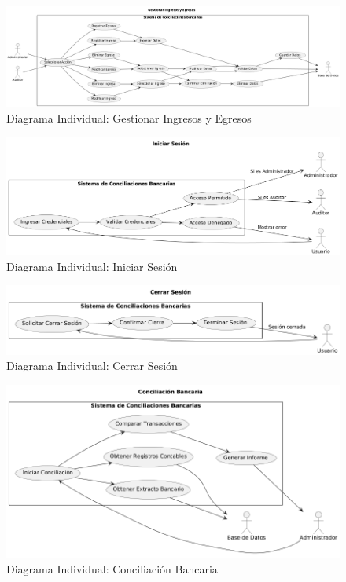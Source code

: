 \documentclass{article}
\begin{document}
\begin{figure}[H]
    \centering
    \includegraphics[width=\textwidth]{casos/GestionarIngresosEgresos.png}
    \caption{Diagrama Individual: Gestionar Ingresos y Egresos}
\end{figure}

\begin{figure}[H]
    \centering
    \includegraphics[width=\textwidth]{casos/IniciarSesion.png}
    \caption{Diagrama Individual: Iniciar Sesión}
\end{figure}

\begin{figure}[H]
    \centering
    \includegraphics[width=\textwidth]{casos/CerrarSesion.png}
    \caption{Diagrama Individual: Cerrar Sesión}
\end{figure}

\begin{figure}[H]
    \centering
    \includegraphics[width=\textwidth]{casos/ConciliacionBancaria.png}
    \caption{Diagrama Individual: Conciliación Bancaria}
\end{figure}
\end{document}
